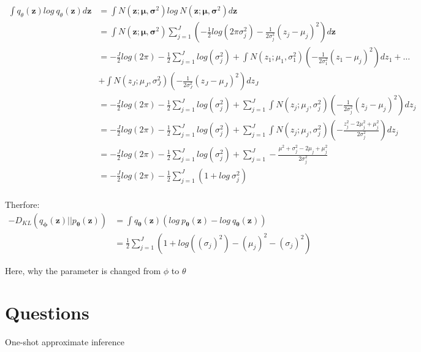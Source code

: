 \documentclass{article}
\begin{document}
\begin{equation}
\begin{split}
\int q_\theta(\boldsymbol{z})log\ q_\theta(\boldsymbol{z})d\boldsymbol{z} &= \int N(\boldsymbol{z};\boldsymbol{\mu}, \boldsymbol{\sigma}^2)log\ N(\boldsymbol{z};\boldsymbol{\mu}, \boldsymbol{\sigma}^2)d\boldsymbol{z}\\
&=\int N(\boldsymbol{z};\boldsymbol{\mu}, \boldsymbol{\sigma}^2) \sum_{j=1}^J(-\frac{1}{2}log(2\pi \sigma_j^2)-  \frac{1}{2\sigma_j^2}(z_j-\mu_j)^2) d\boldsymbol{z}\\
&=-\frac{J}{2}log(2\pi) - \frac{1}{2}\sum_{j=1}^J log(\sigma_j^2)+ \int N(z_1;\mu_1, \sigma_1^2) (-  \frac{1}{2\sigma_1^2}(z_1-\mu_j)^2) dz_1 + \dots \\
&+ \int N(z_J;\mu_J, \sigma_J^2) (-  \frac{1}{2\sigma_J^2}(z_J-\mu_J)^2) dz_J\\
&=-\frac{J}{2}log(2\pi) - \frac{1}{2}\sum_{j=1}^J log(\sigma_j^2)+ \sum_{j=1}^J\int N(z_j;\mu_j, \sigma_j^2) (-\frac{1}{2\sigma_j^2}(z_j-\mu_j)^2)dz_j\\
&=-\frac{J}{2}log(2\pi) - \frac{1}{2}\sum_{j=1}^J log(\sigma_j^2)+ \sum_{j=1}^J\int N(z_j;\mu_j, \sigma_j^2) (-\frac{z_j^2-2\mu_j^2+\mu_j^2}{2\sigma_j^2})dz_j\\
&=-\frac{J}{2}log(2\pi) - \frac{1}{2}\sum_{j=1}^J log(\sigma_j^2)+ \sum_{j=1}^J-\frac{\mu^2+\sigma_j^2-2\mu_j+\mu_j^2}{2\sigma_j^2}\\
&=-\frac{J}{2}log(2\pi) - \frac{1}{2}\sum_{j=1}^J(1+log\ \sigma_j^2)\\
\end{split}
\end{equation}


Therfore:
\begin{equation}
\begin{split}
-D_{KL}(q_{\boldsymbol{\phi}}(\boldsymbol{z})||p_{\boldsymbol{\theta}}(\boldsymbol{z})) &= \int q_{\boldsymbol{\theta}}(\boldsymbol{z})(log\ p_{\boldsymbol{\theta}}(\boldsymbol{z}) - log\ q_{\boldsymbol{\theta}}(\boldsymbol{z}))\\
&=\frac{1}{2}\sum_{j=1}^J(1+log((\sigma_j)^2) - (\mu_j)^2 - (\sigma_j)^2)
\end{split}
\end{equation}

Here, why the parameter is changed from $\phi$ to $\theta$





\section{Questions}
One-shot approximate inference
\end{document}
